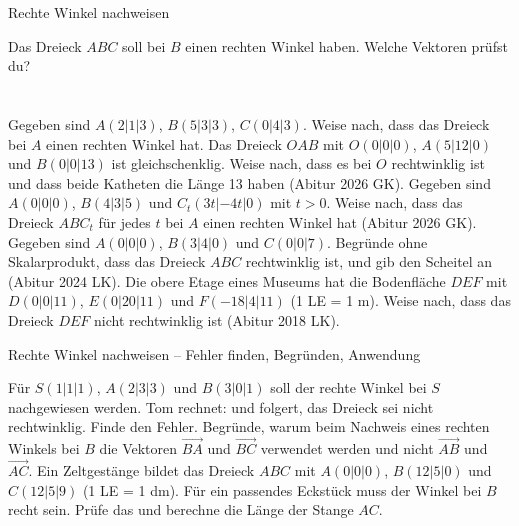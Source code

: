 \begin{aufgabe}{Rechte Winkel nachweisen}
\begin{teile}
\teil Das Dreieck $ABC$ soll bei $B$ einen rechten Winkel haben. Welche Vektoren prüfst du? \\  \\  \\ 
\teil Gegeben sind $A(2 | 1 | 3)$, $B(5 | 3 | 3)$, $C(0 | 4 | 3)$. Weise nach, dass das Dreieck bei $A$ einen rechten Winkel hat.
\teil Das Dreieck $OAB$ mit $O(0 | 0 | 0)$, $A(5 | 12 | 0)$ und $B(0 | 0 | 13)$ ist gleichschenklig. Weise nach, dass es bei $O$ rechtwinklig ist und dass beide Katheten die Länge 13 haben \hfill (Abitur 2026 GK).
\teil Gegeben sind $A(0 | 0 | 0)$, $B(4 | 3 | 5)$ und $C_t(3t | -4t | 0)$ mit $t > 0$. Weise nach, dass das Dreieck $ABC_t$ für jedes $t$ bei $A$ einen rechten Winkel hat \hfill (Abitur 2026 GK).
\teil Gegeben sind $A(0 | 0 | 0)$, $B(3 | 4 | 0)$ und $C(0 | 0 | 7)$. Begründe ohne Skalarprodukt, dass das Dreieck $ABC$ rechtwinklig ist, und gib den Scheitel an \hfill (Abitur 2024 LK).
\teil Die obere Etage eines Museums hat die Bodenfläche $DEF$ mit $D(0 | 0 | 11)$, $E(0 | 20 | 11)$ und $F(-18 | 4 | 11)$ (1 LE = 1 m). Weise nach, dass das Dreieck $DEF$ nicht rechtwinklig ist \hfill (Abitur 2018 LK).
\end{teile}
\end{aufgabe}

\begin{aufgabe}{Rechte Winkel nachweisen – Fehler finden, Begründen, Anwendung}
\begin{teile}
\teil Für $S(1 | 1 | 1)$, $A(2 | 3 | 3)$ und $B(3 | 0 | 1)$ soll der rechte Winkel bei $S$ nachgewiesen werden. Tom rechnet:  und folgert, das Dreieck sei nicht rechtwinklig. Finde den Fehler.
\teil Begründe, warum beim Nachweis eines rechten Winkels bei $B$ die Vektoren $\overrightarrow{BA}$ und $\overrightarrow{BC}$ verwendet werden und nicht $\overrightarrow{AB}$ und $\overrightarrow{AC}$.
\teil Ein Zeltgestänge bildet das Dreieck $ABC$ mit $A(0 | 0 | 0)$, $B(12 | 5 | 0)$ und $C(12 | 5 | 9)$ (1 LE = 1 dm). Für ein passendes Eckstück muss der Winkel bei $B$ recht sein. Prüfe das und berechne die Länge der Stange $AC$.
\end{teile}
\end{aufgabe}
